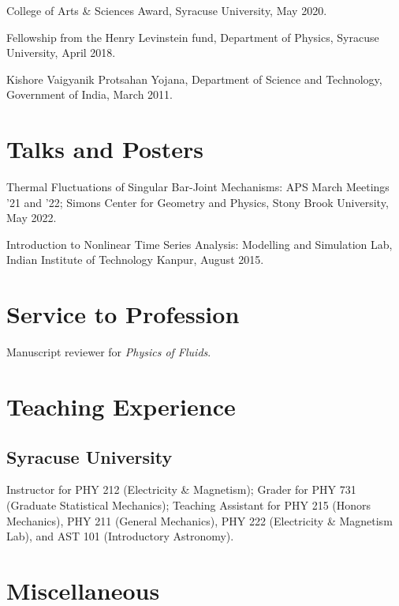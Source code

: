 \documentclass[10pt,article,oneside]{memoir}
\def\nohangpars{%
  \leftskip=0pt%
  \parindent=0pt%
  \setsecindent{0pt}%
  \setsubsecindent{0pt}%
}
\begin{document}
College of Arts \& Sciences Award, Syracuse University, May 2020.

Fellowship from the Henry Levinstein fund, Department of Physics, Syracuse University, April 2018.

Kishore Vaigyanik Protsahan Yojana, Department of Science and Technology, Government of India, March 2011.


\section{Talks and Posters}

Thermal Fluctuations of Singular Bar-Joint Mechanisms: APS March Meetings '21 and '22; Simons Center for Geometry and Physics, Stony Brook University, May 2022.

Introduction to Nonlinear Time Series Analysis: Modelling and Simulation Lab, Indian Institute of Technology Kanpur, August 2015.


\nohangpars

\section{Service to Profession}

Manuscript reviewer for \emph{Physics of Fluids}.


\section{Teaching Experience}

\subsection{Syracuse University}

Instructor for PHY 212 (Electricity \& Magnetism); Grader for PHY 731 (Graduate Statistical Mechanics); Teaching Assistant for PHY 215 (Honors Mechanics), PHY 211 (General Mechanics), PHY 222 (Electricity \& Magnetism Lab), and AST 101 (Introductory Astronomy).


\section{Miscellaneous}
\end{document}
